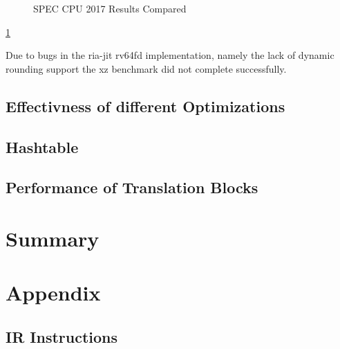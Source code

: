 \documentclass[course=eragp]{aspdoc}
\begin{document}
\begin{figure}
\begin{centering}
        \caption{SPEC CPU 2017 Results Compared}\label{benchmark_results1}
    \end{centering}
\end{figure}

\ref{benchmark_results1}

Due to bugs in the ria-jit rv64fd implementation, namely the lack of dynamic rounding support %
the xz benchmark did not complete successfully.

\subsection{Effectivness of different Optimizations}

\subsection{Hashtable}

\subsection{Performance of Translation Blocks}

\section{Summary}

\clearpage


{}

\appendix
\section{Appendix}

\subsection{IR Instructions}
\end{document}
